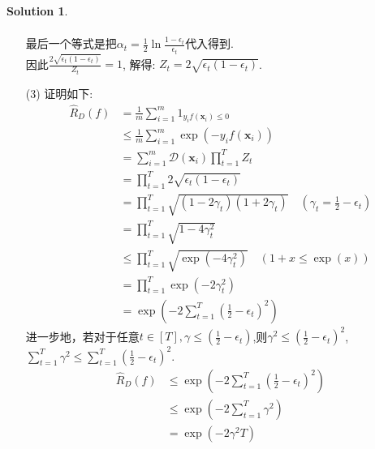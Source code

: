 \documentclass[a4paper,UTF8]{article}
\numberwithin{equation}{section}
\theoremstyle{definition}
\newtheorem*{solution}{Solution}
\begin{document}
\begin{solution}
\begin{enumerate}
\begin{equation}
\begin{aligned}
            \end{aligned}
        \end{equation}
        最后一个等式是把$\alpha_{t} = \frac{1}{2} \ln \frac{1-\epsilon_{t}}{\epsilon_{t}}$代入得到. \\
        因此$\frac{2 \sqrt{\epsilon_{t}\left(1-\epsilon_{t}\right)}}{Z_{t}} = 1$, 解得: $Z_{t}=2 \sqrt{\epsilon_{t}\left(1-\epsilon_{t}\right)}$.
        \item [(3)]
        证明如下:
        \begin{equation}
            \begin{aligned} \hat{R}_{D}(f) & =\frac{1}{m} \sum_{i=1}^{m} 1_{y_{i} f\left(\boldsymbol{x}_{i}\right) \leq 0} \\ & \leq \frac{1}{m} \sum_{i=1}^{m} \exp \left(-y_{i} f\left(\boldsymbol{x}_{i}\right)\right) \\ & =\sum_{i=1}^{m} \mathcal{D}\left(\boldsymbol{x}_{i}\right) \prod_{t=1}^{T} Z_{t} \\ & =\prod_{t=1}^{T} 2 \sqrt{\epsilon_{t}\left(1-\epsilon_{t}\right)} \\
            &= \prod_{t=1}^{T} \sqrt{(1-2\gamma_t)(1+2\gamma_t)} \quad (\gamma_t = \frac{1}{2}-\epsilon_t)\\ &= \prod_{t=1}^{T} \sqrt{1-4\gamma_{t}^{2}}\\&\leq \prod_{t=1}^{T} \sqrt{\exp (-4\gamma_{t}^{2})} \quad (1+x \leqslant \exp (x))\\ &=\prod_{t=1}^{T} \exp \left(-2\gamma_{t}^{2}\right) \\ &=\exp \left(-2 \sum_{t=1}^{T}\left(\frac{1}{2}-\epsilon_{t}\right)^{2}\right)\end{aligned} \nonumber
        \end{equation}
        进一步地，若对于任意$t \in[T], \gamma \leq\left(\frac{1}{2}-\epsilon_{t}\right)$,则$\gamma^2 \leq \left(\frac{1}{2}-\epsilon_{t}\right)^2$, $\sum_{t=1}^{T}\gamma^2 \leq \sum_{t=1}^{T}\left(\frac{1}{2}-\epsilon_{t}\right)^2$.
        \begin{equation}
            \begin{aligned}
                \hat{R}_{D}(f) & \leq \exp \left(-2 \sum_{t=1}^{T}\left(\frac{1}{2}-\epsilon_{t}\right)^{2}\right) \\
                & \leq \exp \left(-2 \sum_{t=1}^{T}\gamma^{2}\right) \\
                &= \exp \left(-2 \gamma^{2}T\right) \nonumber
            \end{aligned}
        \end{equation}

\end{enumerate}
\end{solution}
\end{document}
